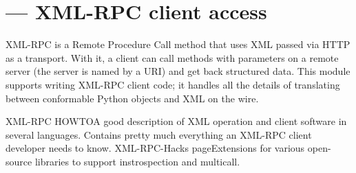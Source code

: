 \section{ --- XML-RPC client access}




XML-RPC is a Remote Procedure Call method that uses XML passed via
HTTP as a transport.  With it, a client can call methods with
parameters on a remote server (the server is named by a URI) and get back
structured data.  This module supports writing XML-RPC client code; it
handles all the details of translating between conformable Python
objects and XML on the wire.

\begin{seealso}
	{XML-RPC HOWTO}{A good description of XML operation and client
	software in several languages.  Contains pretty much
	everything an XML-RPC client developer needs to know.}
	{XML-RPC-Hacks page}{Extensions for various open-source 
	libraries to support instrospection and multicall.}
\end{seealso}

